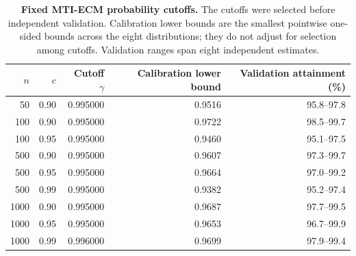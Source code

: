 \begin{table}[!htbp]
\centering
\caption{\textbf{Fixed MTI-ECM probability cutoffs.} The cutoffs were selected before independent validation. Calibration lower bounds are the smallest pointwise one-sided bounds across the eight distributions; they do not adjust for selection among cutoffs. Validation ranges span eight independent estimates.}\label{rqr2026:tab:supp-mti-profile-policy}
\TableStyle
\begin{tabular}{@{}rrrrr@{}}
\toprule
\(n\) & \(c\) & Cutoff \(\gamma\) & Calibration lower bound & Validation attainment (\%)\\
\midrule
50 & 0.90 & 0.995000 & 0.9516 & 95.8--97.8 \\
100 & 0.90 & 0.995000 & 0.9722 & 98.5--99.7 \\
100 & 0.95 & 0.995000 & 0.9460 & 95.1--97.5 \\
500 & 0.90 & 0.995000 & 0.9607 & 97.3--99.7 \\
500 & 0.95 & 0.995000 & 0.9664 & 97.0--99.2 \\
500 & 0.99 & 0.995000 & 0.9382 & 95.2--97.4 \\
1000 & 0.90 & 0.995000 & 0.9687 & 97.7--99.5 \\
1000 & 0.95 & 0.995000 & 0.9653 & 96.7--99.9 \\
1000 & 0.99 & 0.996000 & 0.9699 & 97.9--99.4 \\
\bottomrule
\end{tabular}
\end{table}
